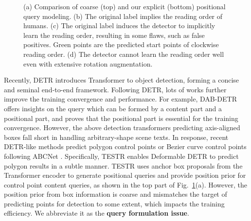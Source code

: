 \documentclass[letterpaper]{article} \usepackage{aaai23}  \usepackage{times}  \usepackage{helvet}  \usepackage{courier}  \usepackage[hyphens]{url}  \usepackage{graphicx} \urlstyle{rm}
\begin{document}
\begin{figure}[t!]
    \centering
    \caption{(a) Comparison of coarse (top) and our explicit (bottom) positional query modeling. (b) The original label implies the reading order of humans. (c) The original label induces the detector to implicitly learn the reading order, resulting in some flaws, such as false positives. Green points are the predicted start points of clockwise reading order. (d) The detector cannot learn the reading order well even with extensive rotation augmentation.}
    \label{fig:Introduction}
\end{figure}


Recently, DETR \cite{carion2020end} introduces Transformer \cite{vaswani2017attention} to object detection, forming a concise and seminal end-to-end framework. Following DETR, lots of works \cite{zhu2020deformable,dai2021dynamic,wang2021fp,meng2021conditional,liu2022dabdetr,wang2022towards} further improve the training convergence and performance. For example, DAB-DETR \cite{liu2022dabdetr} offers insights on the query which can be formed by a content part and a positional part, and proves that the positional part is essential for the training convergence. However, the above detection transformers predicting axis-aligned boxes fall short in handling arbitrary-shape scene texts. In response, recent DETR-like methods \cite{zhang2022text,tang2022few} predict polygon control points or Bezier curve control points following ABCNet \cite{liu2020abcnet}. Specifically, TESTR \cite{zhang2022text} enables Deformable DETR \cite{zhu2020deformable} to predict polygon results in a subtle manner. TESTR uses anchor box proposals from the Transformer encoder to generate positional queries and provide position prior for control point content queries, as shown in the top part of Fig.~\ref{fig:Introduction}(a). However, the position prior from box information is coarse and mismatches the target of predicting points for detection to some extent, which impacts the training efficiency.
We abbreviate it as the \textbf{query formulation issue}. 
\end{document}
